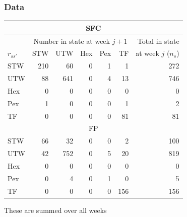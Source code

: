 
\begin{frame}

\frametitle{Data}

\begin{center}
\begin{tabular}{l|rrrrr|r} \hline
\multicolumn{7}{c}{SFC} \\ \hline
&\multicolumn{5}{c|}{Number in state at week $j+1$}&Total in state \\
$r_{ss'}$&STW&UTW&Hex&Pex&TF&at week $j$ ($n_s$)\\ \hline
STW & 210 &  60 & 0 & 1 &  1 & 272 \\
UTW &  88 & 641 & 0 & 4 & 13 & 746 \\
Hex &   0 &   0 & 0 & 0 &  0 &   0 \\
Pex &   1 &   0 & 0 & 0 &  1 &   2 \\
TF  &   0 &   0 & 0 & 0 & 81 &  81 \\ \hline \hline
\multicolumn{7}{c}{FP} \\ \hline
STW &  66 &  32 & 0 & 0 &  2 & 100 \\
UTW &  42 & 752 & 0 & 5 & 20 & 819 \\
Hex &   0 &   0 & 0 & 0 &  0 &   0 \\
Pex &   0 &   4 & 0 & 1 &  0 &   5 \\
TF  &   0 &   0 & 0 & 0 &156 & 156 \\ \hline
\end{tabular}
\end{center}

These are summed over all weeks

\end{frame}


